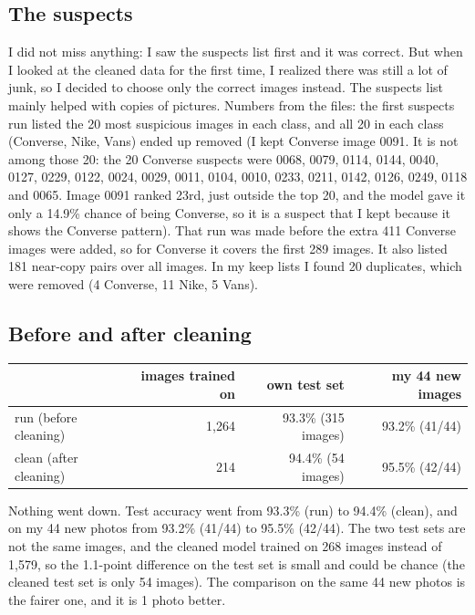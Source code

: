 \documentclass[11pt]{article}
\begin{document}

\subsection*{The suspects}
I did not miss anything: I saw the suspects list first and it was correct. But when I looked at the cleaned data for the first time, I realized there was still a lot of junk, so I decided to choose only the correct images instead. The suspects list mainly helped with copies of pictures. Numbers from the files: the first suspects run listed the 20 most suspicious images in each class, and all 20 in each class (Converse, Nike, Vans) ended up removed (I kept Converse image 0091. It is not among those 20: the 20 Converse suspects were 0068, 0079, 0114, 0144, 0040, 0127, 0229, 0122, 0024, 0029, 0011, 0104, 0010, 0233, 0211, 0142, 0126, 0249, 0118 and 0065. Image 0091 ranked 23rd, just outside the top 20, and the model gave it only a 14.9\% chance of being Converse, so it is a suspect that I kept because it shows the Converse pattern). That run was made before the extra 411 Converse images were added, so for Converse it covers the first 289 images. It also listed 181 near-copy pairs over all images. In my keep lists I found 20 duplicates, which were removed (4 Converse, 11 Nike, 5 Vans).

\subsection*{Before and after cleaning}

\begin{center}\small
\begin{tabular}{lrrr}
\toprule
 & images trained on & own test set & my 44 new images \\
\midrule
run (before cleaning) & 1,264 & 93.3\% (315 images) & 93.2\% (41/44) \\
clean (after cleaning) & 214 & 94.4\% (54 images) & 95.5\% (42/44) \\
\bottomrule
\end{tabular}
\end{center}
Nothing went down. Test accuracy went from 93.3\% (run) to 94.4\% (clean), and on my 44 new photos from 93.2\% (41/44) to 95.5\% (42/44). The two test sets are not the same images, and the cleaned model trained on 268 images instead of 1,579, so the 1.1-point difference on the test set is small and could be chance (the cleaned test set is only 54 images). The comparison on the same 44 new photos is the fairer one, and it is 1 photo better.
\end{document}
